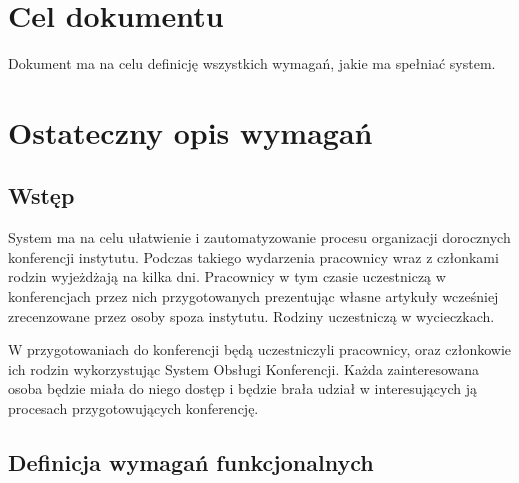 \section{Cel dokumentu}
\suppressfloats[t]

Dokument ma na celu definicję
wszystkich wymagań, jakie ma spełniać system.

\section{Ostateczny opis wymagań}

\subsection{Wstęp}
System ma na celu ułatwienie i zautomatyzowanie procesu organizacji
dorocznych konferencji instytutu. Podczas takiego wydarzenia pracownicy 
wraz z członkami rodzin wyjeżdżają na kilka dni. Pracownicy w tym czasie
uczestniczą w konferencjach przez nich przygotowanych prezentując własne
artykuły wcześniej zrecenzowane przez osoby spoza instytutu. Rodziny 
uczestniczą w wycieczkach. \par
W przygotowaniach do konferencji będą uczestniczyli pracownicy,
oraz członkowie ich rodzin wykorzystując System Obsługi Konferencji. Każda
zainteresowana osoba będzie miała do niego dostęp i będzie brała udział
w interesujących ją procesach przygotowujących konferencję.
\subsection{Definicja wymagań funkcjonalnych}
